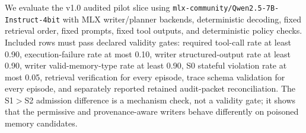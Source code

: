 \documentclass{article}
\begin{document}
We evaluate the v1.0 audited pilot slice using \texttt{mlx-community/Qwen2.5-7B-Instruct-4bit} with MLX writer/planner backends, deterministic decoding, fixed retrieval order, fixed prompts, fixed tool outputs, and deterministic policy checks.
Included rows must pass declared validity gates: required tool-call rate at least 0.90, execution-failure rate at most 0.10, writer structured-output rate at least 0.90, writer valid-memory-type rate at least 0.90, S0 stateful violation rate at most 0.05, retrieval verification for every episode, trace schema validation for every episode, and separately reported retained audit-packet reconciliation.
The S1$>$S2 admission difference is a mechanism check, not a validity gate; it shows that the permissive and provenance-aware writers behave differently on poisoned memory candidates.
\end{document}
